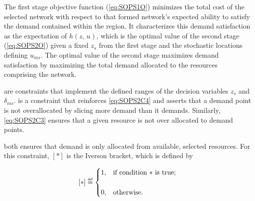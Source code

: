 \documentclass[12pt,dvipsnames]{report}
\newcommand\defeq{\mathrel{\overset{\makebox[0pt]{\mbox{\normalfont\tiny\sffamily def}}}{=}}}
\begin{document}

The first stage objective function (\cref{eq:SOPS1O}) minimizes the total cost of the selected network with respect to that formed network's expected ability to satisfy the demand contained within the region.  It characterizes this demand satisfaction as the expectation of $h\left( z,\, u \right)$, which is the optimal value of the second stage (\cref{eq:SOPS2O}) given a fixed $z_s$ from the first stage and the stochastic locations defining $u_{ms}$.  The optimal value of the second stage maximizes demand satisfaction by maximizing the total demand allocated to the resources comprising the network.

 are constraints that implement the defined ranges of the decision variables $z_s$ and $\delta_{ms}$.   is a constraint that reinforces \cref{eq:SOPS2C4} and asserts that a demand point is not overallocated by slicing more demand than it demands.  Similarly, \cref{eq:SOPS2C3} ensures that a given resource is not over allocated to demand points.

 both ensures that demand is only allocated from available, selected resources.  For this constraint, $\left[ * \right]$ is the Iverson bracket, which is defined by



\iftrue %
\begin{singlespacing}
\begin{equation} \label{eq:iverson}
\left[*\right] \defeq
	\begin{cases}
		1,& \text{if condition $*$ is true;}\\
		\\
		0,& \text{otherwise}.
	\end{cases}
\end{equation}
\end{singlespacing}
\else
\begin{equation} \label{eq:iverson}
\mathbbm{1}_{\{*\}} \defeq
	\begin{cases}
		1,& \text{if condition $\{*\}$ is true;}\\
		0,& \text{otherwise}.
	\end{cases}
\end{equation}
\fi
\end{document}
